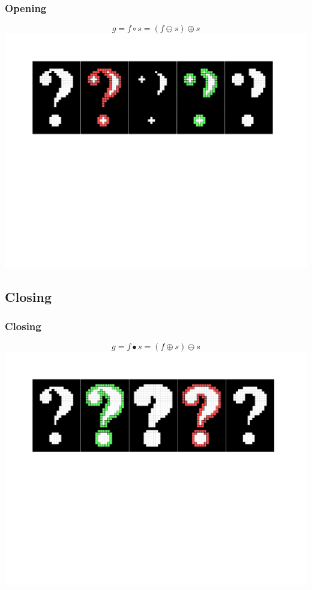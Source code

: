 \documentclass{beamer}
\begin{document}
\begin{frame}
\frametitle{Opening}
\begin{center}
\begin{equation*}
g = f \circ s = (f \ominus s) \oplus s
\end{equation*}
\includegraphics[width=1\textwidth,trim={0 0 0 0.5in},clip]{opening}
\end{center}
\end{frame}

\subsection[Closing]{Closing}

\begin{frame}
\frametitle{Closing}
\begin{center}
\begin{equation*}
g = f \bullet s = (f \oplus s) \ominus s
\end{equation*}
\includegraphics[width=1\textwidth,trim={0 0 0 0.5in},clip]{closing}
\end{center}
\end{frame}
\end{document}
